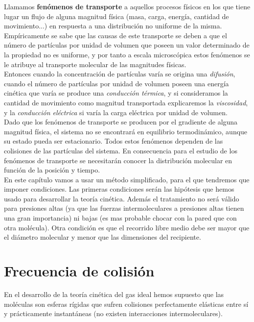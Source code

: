 \documentclass[12pt,a4paper,oneside]{book}
\begin{document}
Llamamos \textbf{fenómenos de transporte} a aquellos procesos físicos en los que tiene lugar un flujo de alguna magnitud física (masa, carga, energía, cantidad de movimiento...) en respuesta a una distribución no uniforme de la misma. Empíricamente se sabe que las causas de este transporte se deben a que el número de partículas por unidad de volumen que poseen un valor determinado de la propiedad no es uniforme, y por tanto a escala microscópica estos fenómenos se le atribuye al transporte molecular de las magnitudes físicas. \\
 
Entonces cuando la concentración de partículas varía se origina una \textit{difusión}, cuando el número de partículas por unidad de volumen poseen una energía cinética que varía se produce una \textit{conducción térmica}, y si consideramos la cantidad de movimiento como magnitud transportada explicaremos la \textit{viscosidad}, y la \textit{conducción eléctrica} si varía la carga eléctrica por unidad de volumen. \\

Dado que los fenómenos de transporte se producen por el gradiente de alguna magnitud física, el sistema no se encontrará en equilibrio termodinámico, aunque su estado pueda ser estacionario. Todos estos fenómenos dependen de las colisiones de las partículas del sistema. En consecuencia para el estudio de los fenómenos de transporte se necesitarán conocer la distribución molecular en función de la posición y tiempo. \\

En este capítulo vamos a usar un método simplificado, para el que tendremos que imponer condiciones. Las primeras condiciones serán las hipótesis que hemos usado para desarrollar la teoría cinética. Además el tratamiento no será válido para presiones altas (ya que las fuerzas intermoleculares a presiones altas tienen una gran importancia) ni bajas (es mas probable chocar con la pared que con otra molécula). Otra condición es que el recorrido libre medio debe ser mayor que el diámetro molecular y menor que las dimensiones del recipiente. 

\section{Frecuencia de colisión}

En el desarrollo de la teoría cinética del gas ideal hemos supuesto que las moléculas son esferas rígidas que sufren colisiones perfectamente elásticas entre sí y prácticamente instantáneas (no existen interacciones intermoleculares). \\
\end{document}
